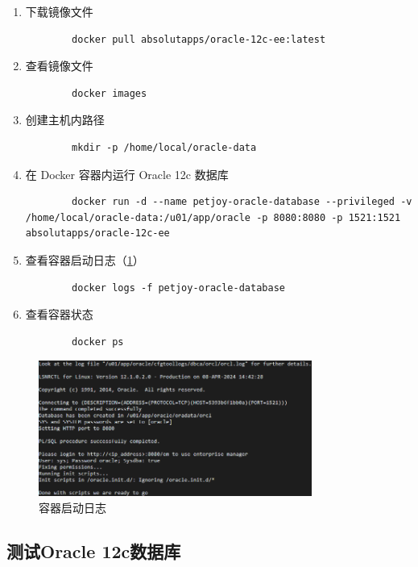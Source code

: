 \begin{enumerate}
	\item 下载镜像文件
	\begin{verbatim}
		docker pull absolutapps/oracle-12c-ee:latest
	\end{verbatim}
	\item 查看镜像文件
	\begin{verbatim}
		docker images
	\end{verbatim}
	\item 创建主机内路径
	\begin{verbatim}
		mkdir -p /home/local/oracle-data
	\end{verbatim}
	\item 在 Docker 容器内运行 Oracle 12c 数据库
	\begin{verbatim}
		docker run -d --name petjoy-oracle-database --privileged -v /home/local/oracle-data:/u01/app/oracle -p 8080:8080 -p 1521:1521 absolutapps/oracle-12c-ee
	\end{verbatim}
	\item 查看容器启动日志（\cref{fig:ContainerStartupLog}）
	\begin{verbatim}
		docker logs -f petjoy-oracle-database
	\end{verbatim}
	\item 查看容器状态
	\begin{verbatim}
		docker ps
	\end{verbatim}
\end{enumerate}

\begin{figure}[htbp]
	\centering
	\includegraphics[width=0.8\textwidth]{figures/ContainerStartupLog.png}
	\caption{容器启动日志}
	\label{fig:ContainerStartupLog}
\end{figure}

\subsection{测试Oracle 12c数据库}

